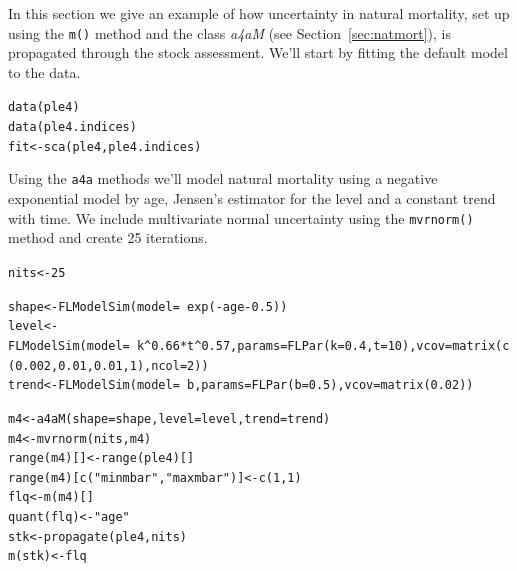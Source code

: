 \documentclass[a4paper,english,10pt]{article}\usepackage[]{graphicx}\usepackage[]{color}
\makeatletter
\newcommand{\hlnum}[1]{\textcolor[rgb]{0.2,0.2,0.2}{#1}}%
\newcommand{\hlstr}[1]{\textcolor[rgb]{0.2,0.2,0.2}{#1}}%
\newcommand{\hlopt}[1]{\textcolor[rgb]{0.2,0.2,0.2}{#1}}%
\newcommand{\hlstd}[1]{\textcolor[rgb]{0,0,0}{#1}}%
\newcommand{\hlkwb}[1]{\textcolor[rgb]{0.361,0.506,0.596}{#1}}%
\newcommand{\hlkwc}[1]{\textcolor[rgb]{0.361,0.506,0.596}{#1}}%
\newcommand{\hlkwd}[1]{\textcolor[rgb]{0.361,0.506,0.596}{#1}}%
\newenvironment{kframe}{%
 \def\at@end@of@kframe{}%
 \ifinner\ifhmode%
  \def\at@end@of@kframe{\end{minipage}}%
  \begin{minipage}{\columnwidth}%
 \fi\fi%
 \def\FrameCommand##1{\hskip\@totalleftmargin \hskip-\fboxsep
 \colorbox{shadecolor}{##1}\hskip-\fboxsep
     \hskip-\linewidth \hskip-\@totalleftmargin \hskip\columnwidth}%
 \MakeFramed {\advance\hsize-\width
   \@totalleftmargin\z@ \linewidth\hsize
   \@setminipage}}%
 {\par\unskip\endMakeFramed%
 \at@end@of@kframe}
\newenvironment{knitrout}{}{} %
\newcommand{\initiative}[1]{{\texttt{#1}}}
\newcommand{\code}[1]{{\texttt{#1}}}
\newcommand{\class}[1]{{\textit{#1}}}
\makeatother
\begin{document}
In this section we give an example of how uncertainty in natural mortality, set up using the \code{m()} method and the class \class{a4aM} (see Section~\ref{sec:natmort}), is propagated through the stock assessment. We'll start by fitting the default model to the data. 

\begin{knitrout}
\color{fgcolor}\begin{kframe}
\begin{alltt}
\hlkwd{data}\hlstd{(ple4)}
\hlkwd{data}\hlstd{(ple4.indices)}
\hlstd{fit} \hlkwb{<-} \hlkwd{sca}\hlstd{(ple4, ple4.indices)}
\end{alltt}
\end{kframe}
\end{knitrout}

Using the \initiative{a4a} methods we'll model natural mortality using a negative exponential model by age, Jensen's estimator for the level and a constant trend with time. We include multivariate normal uncertainty using the \code{mvrnorm()} method and create 25 iterations. 

\begin{knitrout}
\color{fgcolor}\begin{kframe}
\begin{alltt}
\hlstd{nits} \hlkwb{<-} \hlnum{25}

\hlstd{shape} \hlkwb{<-} \hlkwd{FLModelSim}\hlstd{(}\hlkwc{model}\hlstd{=}\hlopt{~}\hlkwd{exp}\hlstd{(}\hlopt{-}\hlstd{age}\hlopt{-}\hlnum{0.5}\hlstd{))}
\hlstd{level} \hlkwb{<-} \hlkwd{FLModelSim}\hlstd{(}\hlkwc{model}\hlstd{=}\hlopt{~}\hlstd{k}\hlopt{^}\hlnum{0.66}\hlopt{*}\hlstd{t}\hlopt{^}\hlnum{0.57}\hlstd{,} \hlkwc{params} \hlstd{=} \hlkwd{FLPar}\hlstd{(}\hlkwc{k}\hlstd{=}\hlnum{0.4}\hlstd{,} \hlkwc{t}\hlstd{=}\hlnum{10}\hlstd{),} \hlkwc{vcov}\hlstd{=}\hlkwd{matrix}\hlstd{(}\hlkwd{c}\hlstd{(}\hlnum{0.002}\hlstd{,} \hlnum{0.01}\hlstd{,}\hlnum{0.01}\hlstd{,} \hlnum{1}\hlstd{),} \hlkwc{ncol}\hlstd{=}\hlnum{2}\hlstd{))}
\hlstd{trend} \hlkwb{<-} \hlkwd{FLModelSim}\hlstd{(}\hlkwc{model}\hlstd{=}\hlopt{~}\hlstd{b,} \hlkwc{params}\hlstd{=}\hlkwd{FLPar}\hlstd{(}\hlkwc{b}\hlstd{=}\hlnum{0.5}\hlstd{),} \hlkwc{vcov}\hlstd{=}\hlkwd{matrix}\hlstd{(}\hlnum{0.02}\hlstd{))}

\hlstd{m4} \hlkwb{<-} \hlkwd{a4aM}\hlstd{(}\hlkwc{shape}\hlstd{=shape,} \hlkwc{level}\hlstd{=level,} \hlkwc{trend}\hlstd{=trend)}
\hlstd{m4} \hlkwb{<-} \hlkwd{mvrnorm}\hlstd{(nits, m4)}
\hlkwd{range}\hlstd{(m4)[]} \hlkwb{<-} \hlkwd{range}\hlstd{(ple4)[]}
\hlkwd{range}\hlstd{(m4)[}\hlkwd{c}\hlstd{(}\hlstr{"minmbar"}\hlstd{,}\hlstr{"maxmbar"}\hlstd{)]}\hlkwb{<-}\hlkwd{c}\hlstd{(}\hlnum{1}\hlstd{,}\hlnum{1}\hlstd{)}
\hlstd{flq} \hlkwb{<-} \hlkwd{m}\hlstd{(m4)[]}
\hlkwd{quant}\hlstd{(flq)} \hlkwb{<-} \hlstr{"age"}
\hlstd{stk} \hlkwb{<-} \hlkwd{propagate}\hlstd{(ple4, nits)}
\hlkwd{m}\hlstd{(stk)} \hlkwb{<-} \hlstd{flq}
\end{alltt}
\end{kframe}
\end{knitrout}
\end{document}
